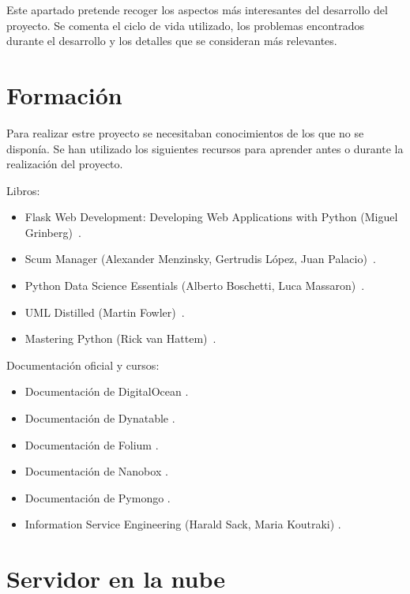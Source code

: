 
Este apartado pretende recoger los aspectos más interesantes del desarrollo del proyecto. Se comenta el ciclo de vida utilizado, los problemas encontrados durante el desarrollo y los detalles que se consideran más relevantes.

\section{Formación}

Para realizar estre proyecto se necesitaban conocimientos de los que no se disponía. Se han utilizado los siguientes recursos para aprender antes o durante la realización del proyecto.

Libros:

\begin{itemize}
	\item Flask Web Development: Developing Web Applications with Python (Miguel Grinberg)~\cite{book:flask}.
	\item Scum Manager (Alexander Menzinsky, Gertrudis López, Juan Palacio)~\cite{book:scrum}.
	\item Python Data Science Essentials (Alberto Boschetti, Luca Massaron)~\cite{book:pythondatascience}.
	\item UML Distilled (Martin Fowler)~\cite{book:umldistilled}.
	\item Mastering Python (Rick van Hattem)~\cite{book:masteringpython}.
\end{itemize}

Documentación oficial y cursos:

\begin{itemize}
	\item Documentación de DigitalOcean \cite{docs:digitalocean}.
	\item Documentación de Dynatable \cite{docs:dynatable}.
	\item Documentación de Folium \cite{docs:folium}.
	\item Documentación de Nanobox \cite{docs:nanobox}.
	\item Documentación de Pymongo \cite{docs:pymongo}.
	\item Information Service Engineering (Harald Sack, Maria Koutraki) \cite{misc:informationserviceengineering}.
\end{itemize}

\section{Servidor en la nube}

